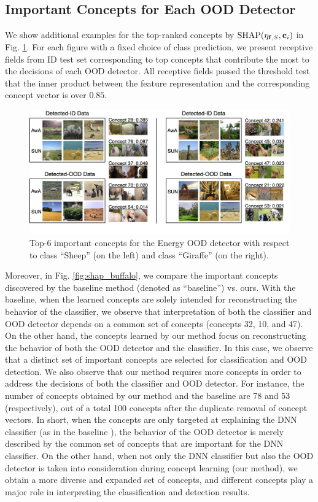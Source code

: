 \subsection{Important Concepts for Each OOD Detector}
\label{sec:appendix-explanation}
We show additional examples for the top-ranked concepts by $\textrm{SHAP}(\eta_{\mathbf{f}, S}, \mathbf{c}_i)$ in Fig. \ref{fig:app-shap}.
For each figure with a fixed choice of class prediction, we present receptive fields from ID test set corresponding to top concepts that contribute the most to the decisions of each OOD detector.
All receptive fields passed the threshold test that the inner product between the feature representation and the corresponding concept vector is over $0.85$.
\begin{figure}[ht]
\centering
\includegraphics[width=\textwidth]{figures/concepts.jpg}
\vspace{-0.3in}
\caption{Top-6 important concepts for the Energy OOD detector with respect to class ``Sheep'' (on the left) and class ``Giraffe'' (on the right).}
\label{fig:app-shap}
\end{figure}

Moreover, in Fig. \ref{fig:shap_buffalo}, we compare the important concepts discovered by the baseline method \cite{yeh2020completeness} (denoted as ``baseline'') vs. ours.
With the baseline, when the learned concepts are solely intended for reconstructing the behavior of the classifier, we observe that interpretation of both the classifier and OOD detector depends on a common set of concepts (\ie concepts 32, 10, and 47).
On the other hand, the concepts learned by our method focus on reconstructing the behavior of both the OOD detector and the classifier. In this case, we observe that a distinct set of important concepts are selected for classification and OOD detection.
We also observe that our method requires more concepts in order to address the decisions of both the classifier and OOD detector.
For instance, the number of concepts obtained by our method and the baseline are 78 and 53 (respectively), out of a total 100 concepts after the duplicate removal of concept vectors.
In short, when the concepts are only targeted at explaining the DNN classifier (as in the baseline \cite{yeh2020completeness}), the behavior of the OOD detector is merely described by the common set of concepts that are important for the DNN classifier.
On the other hand, when not only the DNN classifier but also the OOD detector is taken into consideration during concept learning (\ie our method), we obtain a more diverse and expanded set of concepts, and different concepts play a major role in interpreting the classification and detection results. 

